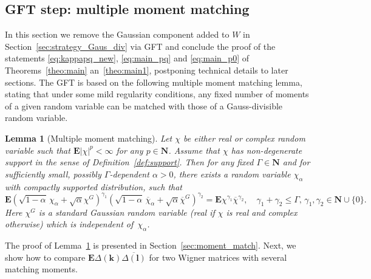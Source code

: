 \documentclass[10pt]{amsart}
\newtheorem{lemma}[theorem]{Lemma}
\numberwithin{equation}{section}
\newcommand{\E}{\mathbf{E}}
\newcommand{\N}{\mathbf{N}}
\begin{document}
\subsection{GFT step: multiple moment matching}\label{sec:strategy_Wigner}


In this section we remove the Gaussian component added to $W$ in Section~\ref{sec:strategy_Gaus_div} via GFT and conclude the proof of the statements \eqref{eq:kappapq_new}, \eqref{eq:main_pq} and \eqref{eq:main_p0} of Theorems~\ref{theo:main} an~\ref{theo:main1}, postponing technical details to later sections. The GFT is based on the following multiple moment matching lemma, stating that under some mild regularity conditions, any fixed number of moments of a given random variable can be matched with those of a Gauss-divisible random variable.

\begin{lemma}[Multiple moment matching]\label{lem:moment_match} Let $\chi$ be either real or complex random variable such that $\E |\chi|^p<\infty$ for any $p\in\N$. Assume that $\chi$ has non-degenerate support in the sense of Definition~\ref{def:support}. Then for any fixed $\Gamma\in\N$ and for sufficiently small, possibly $\Gamma$-dependent $\alpha>0$, there exists a random variable $\chi_\alpha$ with compactly supported distribution, such that
\begin{equation}
\E \left(\sqrt{1-\alpha}\,\chi_\alpha +\sqrt{\alpha} \chi^G\right)^{\gamma_1}\left(\sqrt{1-\alpha}\,\overline{\chi}_\alpha +\sqrt{\alpha} \overline{\chi}^G\right)^{\gamma_2} = \E \chi^{\gamma_1}\overline{\chi}^{\gamma_2},\quad \gamma_1+\gamma_2\le \Gamma,\, \gamma_1,\gamma_2\in\N\cup\{0\}.
\label{eq:moment_match}
\end{equation}
Here $\chi^G$ is a standard Gaussian random variable (real if $\chi$ is real and complex otherwise) which is independent of~$\chi_\alpha$.
\end{lemma}

The proof of Lemma~\ref{lem:moment_match} is presented in Section~\ref{sec:moment_match}. Next, we show how to compare $\E \Delta(\bm{k})\overline{\Delta(\bm{l})}$ for two Wigner matrices with several matching moments.
\end{document}
